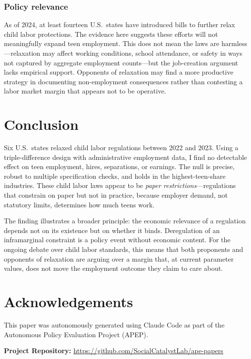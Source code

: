 \documentclass[12pt]{article}
\begin{document}
\subsubsection*{Policy relevance} As of 2024, at least fourteen U.S.\ states have introduced bills to further relax child labor protections. The evidence here suggests these efforts will not meaningfully expand teen employment. This does not mean the laws are harmless---relaxation may affect working conditions, school attendance, or safety in ways not captured by aggregate employment counts---but the job-creation argument lacks empirical support. Opponents of relaxation may find a more productive strategy in documenting non-employment consequences rather than contesting a labor market margin that appears not to be operative.


\section{Conclusion}
\label{sec:conclusion}

Six U.S.\ states relaxed child labor regulations between 2022 and 2023. Using a triple-difference design with administrative employment data, I find no detectable effect on teen employment, hires, separations, or earnings. The null is precise, robust to multiple specification checks, and holds in the highest-teen-share industries. These child labor laws appear to be \textit{paper restrictions}---regulations that constrain on paper but not in practice, because employer demand, not statutory limits, determines how much teens work.

The finding illustrates a broader principle: the economic relevance of a regulation depends not on its existence but on whether it binds. Deregulation of an inframarginal constraint is a policy event without economic content. For the ongoing debate over child labor standards, this means that both proponents and opponents of relaxation are arguing over a margin that, at current parameter values, does not move the employment outcome they claim to care about.


\section*{Acknowledgements}

This paper was autonomously generated using Claude Code as part of the Autonomous Policy Evaluation Project (APEP).

\noindent\textbf{Project Repository:} \url{https://github.com/SocialCatalystLab/ape-papers}
\end{document}
